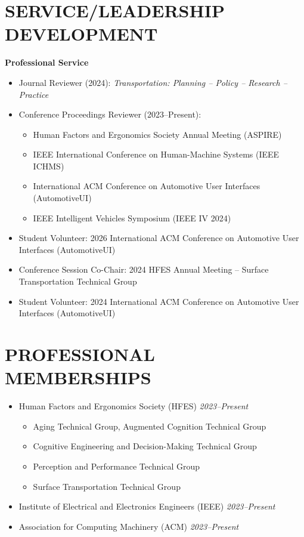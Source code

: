 \documentclass[11pt]{article}
\begin{document}
\vspace{0.6em}

\section*{SERVICE/LEADERSHIP DEVELOPMENT}
\textbf{Professional Service}
\begin{itemize}[leftmargin=*, topsep=0pt, itemsep=6pt]
  \item Journal Reviewer (2024): \textit{Transportation: Planning – Policy – Research – Practice}
  \item Conference Proceedings Reviewer (2023–Present):
  \begin{itemize}
    \item Human Factors and Ergonomics Society Annual Meeting (ASPIRE)
    \item IEEE International Conference on Human-Machine Systems (IEEE ICHMS)
    \item International ACM Conference on Automotive User Interfaces (AutomotiveUI)
    \item IEEE Intelligent Vehicles Symposium (IEEE IV 2024)
  \end{itemize}
  \item Student Volunteer: 2026 International ACM Conference on Automotive User Interfaces (AutomotiveUI)
  \item Conference Session Co-Chair: 2024 HFES Annual Meeting – Surface Transportation Technical Group
  \item Student Volunteer: 2024 International ACM Conference on Automotive User Interfaces (AutomotiveUI)
\end{itemize}

\vspace{0.6em}

\section*{PROFESSIONAL MEMBERSHIPS}
\begin{itemize}[leftmargin=*, topsep=0pt, itemsep=6pt]
  \item Human Factors and Ergonomics Society (HFES) \textit{2023–Present}
  \begin{itemize}
    \item Aging Technical Group, Augmented Cognition Technical Group
    \item Cognitive Engineering and Decision-Making Technical Group
    \item Perception and Performance Technical Group
    \item Surface Transportation Technical Group
  \end{itemize}
  \item Institute of Electrical and Electronics Engineers (IEEE) \textit{2023–Present}
  \item Association for Computing Machinery (ACM) \textit{2023–Present}
\end{itemize}
\end{document}
